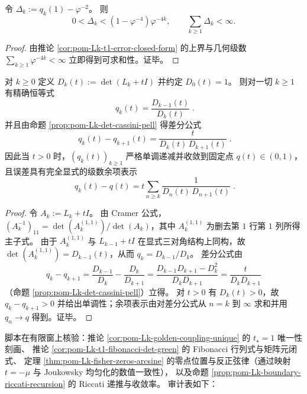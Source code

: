 \begin{corollary}[黄金层级截断误差的绝对可求和性]\label{cor:pom-Lk-t1-error-summable}
令 \(\Delta_k:=q_k(1)-\varphi^{-2}\)。
则
\[
0<\Delta_k<(1-\varphi^{-4})\varphi^{-4k},
\qquad
\sum_{k\ge 1}\Delta_k<\infty.
\]
\end{corollary}
\begin{proof}
由推论 \ref{cor:pom-Lk-t1-error-closed-form} 的上界与几何级数
\(
\sum_{k\ge 1}\varphi^{-4k}<\infty
\)
立即得到可求和性。证毕。
\end{proof}

\begin{corollary}\label{cor:pom-Lk-riccati-error-by-determinants}
对 \(k\ge 0\) 定义 \(D_k(t):=\det(L_k+tI)\) 并约定 \(D_0(t)=1\)。
则对一切 \(k\ge 1\) 有精确恒等式
\[
\boxed{\;
q_k(t)=\frac{D_{k-1}(t)}{D_k(t)}\; }.
\]
并且由命题 \ref{prop:pom-Lk-det-cassini-pell} 得差分公式
\[
\boxed{\;
q_k(t)-q_{k+1}(t)=\frac{t}{D_k(t)\,D_{k+1}(t)}\; }.
\]
因此当 \(t>0\) 时，\((q_k(t))_{k\ge 1}\) 严格单调递减并收敛到固定点 \(q(t)\in(0,1)\)，且误差具有完全显式的级数余项表示
\[
\boxed{\;
q_k(t)-q(t)=t\sum_{n\ge k}\frac{1}{D_n(t)\,D_{n+1}(t)}\; }.
\]
\end{corollary}

\begin{proof}
令 \(A_k:=L_k+tI\)。
由 Cramer 公式，
\(
(A_k^{-1})_{11}=\det(A_k^{(1,1)})/\det(A_k)
\)，其中 \(A_k^{(1,1)}\) 为删去第 \(1\) 行第 \(1\) 列所得主子式。
由于 \(A_k^{(1,1)}\) 与 \(L_{k-1}+tI\) 在显式三对角结构上同构，故 \(\det(A_k^{(1,1)})=D_{k-1}(t)\)，从而 \(q_k=D_{k-1}/D_k\)。
差分公式由
\[
q_k-q_{k+1}
=\frac{D_{k-1}}{D_k}-\frac{D_k}{D_{k+1}}
=\frac{D_{k-1}D_{k+1}-D_k^2}{D_kD_{k+1}}
=\frac{t}{D_kD_{k+1}}
\]
（命题 \ref{prop:pom-Lk-det-cassini-pell}）立得。
对 \(t>0\) 有 \(D_k(t)>0\)，故 \(q_k-q_{k+1}>0\) 并给出单调性；余项表示由对差分公式从 \(n=k\) 到 \(\infty\) 求和并用 \(q_n\to q\) 得到。证毕。
\end{proof}

\begin{remark}\label{rem:pom-fence-green-kernel-golden-coupling-audit}
脚本在有限窗上核验：推论 \ref{cor:pom-Lk-golden-coupling-unique} 的 \(t_\star=1\) 唯一性刻画、
推论 \ref{cor:pom-Lk-t1-fibonacci-det-green} 的 Fibonacci 行列式与矩阵元闭式、
定理 \ref{thm:pom-Lk-fisher-zeros-arcsine} 的零点位置与反正弦律（通过映射 \(t=-\mu\) 与 Joukowsky 均匀化的数值一致性），
以及命题 \ref{prop:pom-Lk-boundary-riccati-recursion} 的 Riccati 递推与收敛率。
审计表如下：

\end{remark}

